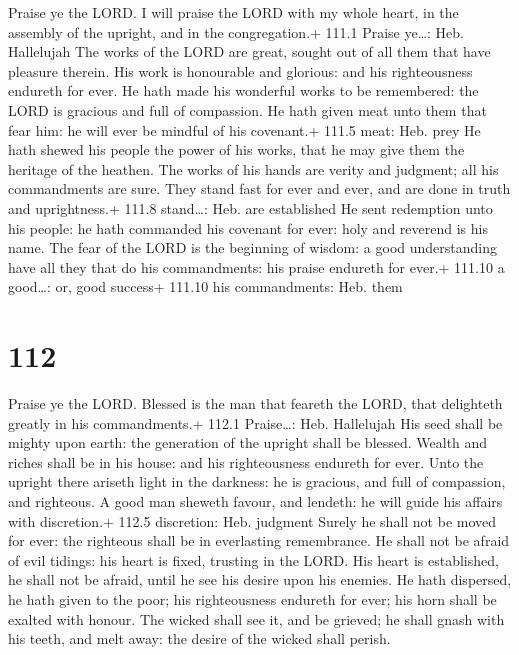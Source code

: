  Praise ye the LORD. I will praise the LORD with my whole
heart, in the assembly of the upright, and in the congregation.+ 111.1
Praise ye\ldots: Heb. Hallelujah  The works of the LORD are
great, sought out of all them that have pleasure therein. 
His work is honourable and glorious: and his righteousness endureth for
ever.  He hath made his wonderful works to be remembered:
the LORD is gracious and full of compassion.  He hath given
meat unto them that fear him: he will ever be mindful of his covenant.+
111.5 meat: Heb. prey  He hath shewed his people the power
of his works, that he may give them the heritage of the heathen.
 The works of his hands are verity and judgment; all his
commandments are sure.  They stand fast for ever and ever,
and are done in truth and uprightness.+ 111.8 stand\ldots: Heb. are
established  He sent redemption unto his people: he hath
commanded his covenant for ever: holy and reverend is his name.
 The fear of the LORD is the beginning of wisdom: a good
understanding have all they that do his commandments: his praise
endureth for ever.+ 111.10 a good\ldots: or, good success+ 111.10 his
commandments: Heb. them

\hypertarget{section-111}{%
\section{112}\label{section-111}}

 Praise ye the LORD. Blessed is the man that feareth the
LORD, that delighteth greatly in his commandments.+ 112.1 Praise\ldots:
Heb. Hallelujah  His seed shall be mighty upon earth: the
generation of the upright shall be blessed.  Wealth and
riches shall be in his house: and his righteousness endureth for ever.
 Unto the upright there ariseth light in the darkness: he is
gracious, and full of compassion, and righteous.  A good man
sheweth favour, and lendeth: he will guide his affairs with discretion.+
112.5 discretion: Heb. judgment  Surely he shall not be
moved for ever: the righteous shall be in everlasting remembrance.
 He shall not be afraid of evil tidings: his heart is fixed,
trusting in the LORD.  His heart is established, he shall
not be afraid, until he see his desire upon his enemies.  He
hath dispersed, he hath given to the poor; his righteousness endureth
for ever; his horn shall be exalted with honour.  The
wicked shall see it, and be grieved; he shall gnash with his teeth, and
melt away: the desire of the wicked shall perish.

